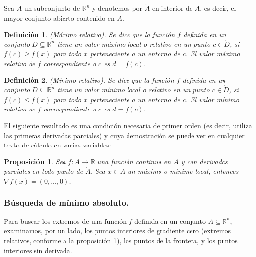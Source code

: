 \documentclass[a4paper,11pt]{article}
\newtheorem{proposition}{Proposición}
\newtheorem{definition}{Definición}
\begin{document}
\noindent
Sea $A$ un subconjunto de $\mathbb{R}^n$ y denotemos por $\mathring{A}$ en interior de $A$, es decir, el mayor conjunto abierto contenido en $A$.
\begin{definition}
(Máximo relativo). Se dice que la función $f$ definida en un conjunto $D\subseteq \mathbb{R}^n$ tiene un valor máximo local o relativo en un punto $c\in\mathring{D}$, si $f(c)\geq f(x)$ para todo $x$ perteneciente a un entorno de $c$. El valor máximo relativo de $f$ correspondiente a $c$ es $d = f(c)$.
\end{definition}
\begin{definition}
(Mínimo relativo). Se dice que la función $f$ definida en un conjunto $D\subseteq \mathbb{R}^n$ tiene un valor mínimo local o relativo en un punto $c\in\mathring{D}$, si $f(c)\leq f(x)$ para todo $x$ perteneciente a un entorno de $c$. El valor mínimo relativo de $f$ correspondiente a $c$ es $d = f(c)$.
\end{definition}
El siguiente resultado es una condición necesaria de primer orden (es decir,
utiliza las primeras derivadas parciales) y cuya demostración se puede ver en
cualquier texto de cálculo en varias variables:

\begin{proposition}
Sea $ f : A \rightarrow \mathbb{R}$ una función continua en $A$ y con derivadas
parciales en todo punto de $\mathring{A}$. Sea $x\in A$ un máximo o mínimo local,
entonces $\nabla f(x)=(0,...,0)$.

\end{proposition}

\subsubsection{Búsqueda de mínimo absoluto.}
Para buscar los extremos de una función $f$ definida en un conjunto $A\subseteq \mathbb{R}^n$, examinamos, por un lado, los
puntos interiores de gradiente cero (extremos relativos, conforme a la proposición
1), los puntos de la frontera, y los puntos interiores sin derivada. \\
\end{document}
